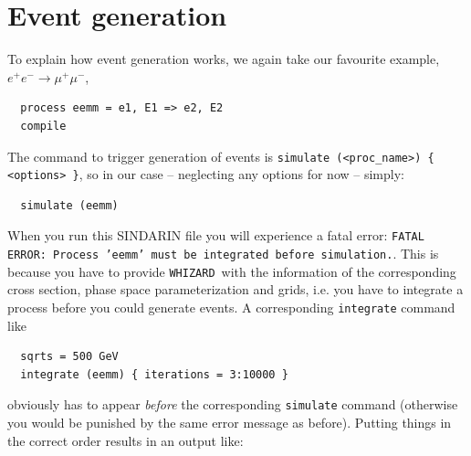\documentclass[12pt]{book}
\newcommand{\ttt}[1]{\texttt{#1}}
\newcommand{\whizard}{\texttt{WHIZARD}}
\begin{document}
\section{Event generation}

To explain how event generation works, we again take our favourite
example, $e^+e^- \to \mu^+ \mu^-$,
\begin{verbatim}
  process eemm = e1, E1 => e2, E2
  compile
\end{verbatim}
The command to trigger generation of events is \ttt{simulate
  (<proc\_name>) \{ <options> \}}, so in our case -- neglecting any
options for now -- simply:
\begin{verbatim}
  simulate (eemm)
\end{verbatim}
When you run this SINDARIN file you will experience a fatal error:
\ttt{FATAL ERROR: Process 'eemm' must be integrated before simulation.}.
This is because you have to provide \whizard\ with the information of
the corresponding cross section, phase space parameterization and
grids, i.e. you have to integrate a process before you could generate
events. A corresponding \ttt{integrate} command like
\begin{verbatim}
  sqrts = 500 GeV
  integrate (eemm) { iterations = 3:10000 }
\end{verbatim}
obviously has to appear {\em before} the corresponding \ttt{simulate}
command (otherwise you would be punished by the same error message as
before). Putting things in the correct order results in an output
like:
\end{document}
